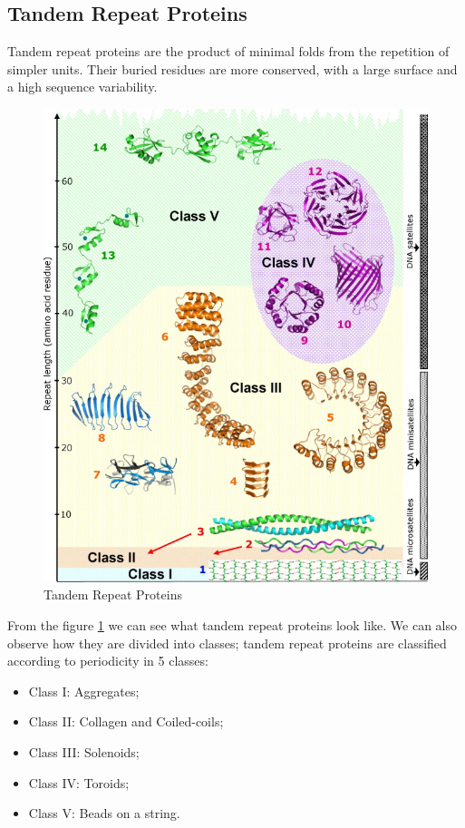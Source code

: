 \vspace{10em}

\subsection{Tandem Repeat Proteins}
Tandem repeat proteins are the product of minimal folds from the repetition of simpler units. Their buried residues are more conserved, with a large surface and a high sequence variability.

\begin{figure}[h!]
	\includegraphics[scale=0.6]{res/proteins_overview/tandem.jpg}
	\centering
	\caption{Tandem Repeat Proteins}
	\label{fig:tandem}
\end{figure}

From the figure \ref{fig:tandem} we can see what tandem repeat proteins look like. We can also observe how they are divided into classes; tandem repeat proteins are classified according to periodicity in 5 classes:
\begin{itemize}
	\item Class I: Aggregates;
	\item Class II: Collagen and Coiled-coils;
	\item Class III: Solenoids;
	\item Class IV: Toroids;
	\item Class V: Beads on a string.
\end{itemize}


